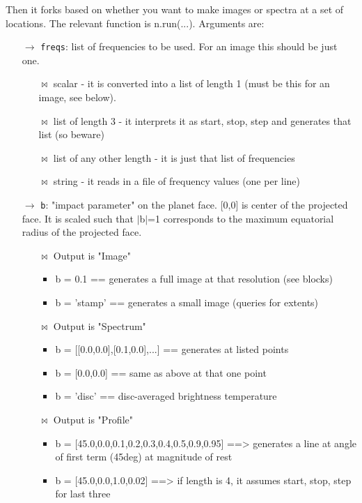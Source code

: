 \documentclass[11pt]{article}
\begin{document}
Then it forks based on whether you want to make images or spectra at a set of locations.  The relevant function is n.run(...).  Arguments are:
\begin{itemize}
\item[$\rightarrow$] \texttt{freqs}:   list of frequencies to be used. For an image this should be just one.
	\begin{itemize}
	\item[$\bowtie$] scalar - it is converted into a list of length 1 (must be this for an image, see below).
	\item[$\bowtie$] list of length 3 - it interprets it as start, stop, step and generates that list (so beware)
        \item[$\bowtie$] list of any other length - it is just that list of frequencies
        \item[$\bowtie$] string - it reads in a file of frequency values (one per line)
	\end{itemize}
\item[$\rightarrow$] \texttt{b}:  "impact parameter" on the planet face.  [0,0] is center of the projected face.  It is scaled such that $|$b$|$=1 corresponds to the maximum equatorial radius of the projected face.
	\begin{itemize}
	\item[$\bowtie$] Output is "Image"
		\begin{itemize}
               	\item b = 0.1  == generates a full image at that resolution (see blocks)
		\item b = 'stamp' == generates a small image (queries for extents)
                	\end{itemize}
        \item[$\bowtie$] Output is "Spectrum"
        		\begin{itemize}
             	\item b = [[0.0,0.0],[0.1,0.0],...]  == generates at listed points
             	\item b = [0.0,0.0] == same as above at that one point
             	\item b = 'disc' == disc-averaged brightness temperature
		\end{itemize}
        \item[$\bowtie$] Output is "Profile"
	        \begin{itemize}
               	\item b = [45.0,0.0,0.1,0.2,0.3,0.4,0.5,0.9,0.95] ==> generates a line at angle of first term (45deg) at magnitude of rest
              	\item b = [45.0,0.0,1.0,0.02]  ==> if length is 4, it assumes start, stop, step for last three
		\end{itemize}
	\end{itemize}


\end{itemize}
\end{document}
